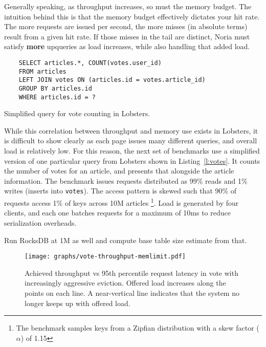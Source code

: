 Generally speaking, as throughput increases, so must the memory budget. The
intuition behind this is that the memory budget effectively dictates your hit
rate. The more requests are issued per second, the more misses (in absolute
terms) result from a given hit rate. If those misses in the tail are
distinct, Noria must satisfy \textbf{more} upqueries as load increases, while
also handling that added load.

\begin{listing}[h]
  \begin{verbatim}
    SELECT articles.*, COUNT(votes.user_id)
    FROM articles
    LEFT JOIN votes ON (articles.id = votes.article_id)
    GROUP BY articles.id
    WHERE articles.id = ?
  \end{verbatim}
  \caption{Simplified query for vote counting in Lobsters.}
  \label{l:votes}
\end{listing}

While this correlation between throughput and memory use exists in Lobsters, it
is difficult to show clearly as each page issues many different queries, and
overall load is relatively low. For this reason, the next set of benchmarks use
a simplified version of one particular query from Lobsters shown in
Listing~\ref{l:votes}. It counts the number of votes for an article, and
presents that alongside the article information. The benchmark issues requests
distributed as 99\% reads and 1\% writes (inserts into \texttt{votes}). The
access pattern is skewed such that 90\% of requests access 1\% of keys across
10M articles%
\footnote{The benchmark samples keys from a Zipfian distribution with a skew
factor ($\alpha$) of 1.15}. Load is generated by four clients, and each one
batches requests for a maximum of 10ms to reduce serialization overheads.

\begin{inprogress}
  Run RocksDB at 1M as well and compute base table size estimate from that.
\end{inprogress}

\begin{figure}[h]
  \centering
  \texttt{[image: graphs/vote-throughput-memlimit.pdf]}
  \caption{Achieved throughput vs 95th percentile request latency in vote with
  increasingly aggressive eviction. Offered load increases along the points on
  each line. A near-vertical line indicates that the system no longer keeps up
  with offered load.}
  \label{f:vote-throughput-memlimit}
\end{figure}

